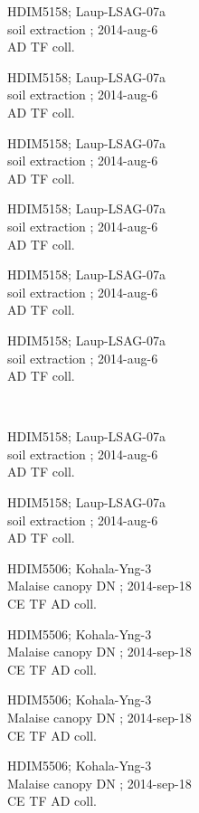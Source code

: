 \documentclass[2pt]{extarticle}
\begin{document}
\noindent
\parbox{0.16\textwidth}{\tiny \raggedright \rule[-0.3\baselineskip]{0pt}{10pt}HDIM5158; Laup-LSAG-07a\\ soil extraction  ; 2014-aug-6\\ AD TF coll.}
\parbox{0.16\textwidth}{\tiny \raggedright \rule[-0.3\baselineskip]{0pt}{10pt}HDIM5158; Laup-LSAG-07a\\ soil extraction  ; 2014-aug-6\\ AD TF coll.}
\parbox{0.16\textwidth}{\tiny \raggedright \rule[-0.3\baselineskip]{0pt}{10pt}HDIM5158; Laup-LSAG-07a\\ soil extraction  ; 2014-aug-6\\ AD TF coll.}
\parbox{0.16\textwidth}{\tiny \raggedright \rule[-0.3\baselineskip]{0pt}{10pt}HDIM5158; Laup-LSAG-07a\\ soil extraction  ; 2014-aug-6\\ AD TF coll.}
\parbox{0.16\textwidth}{\tiny \raggedright \rule[-0.3\baselineskip]{0pt}{10pt}HDIM5158; Laup-LSAG-07a\\ soil extraction  ; 2014-aug-6\\ AD TF coll.}
\parbox{0.16\textwidth}{\tiny \raggedright \rule[-0.3\baselineskip]{0pt}{10pt}HDIM5158; Laup-LSAG-07a\\ soil extraction  ; 2014-aug-6\\ AD TF coll.} \\ 
\vspace{0.001in} 

\noindent
\parbox{0.16\textwidth}{\tiny \raggedright \rule[-0.3\baselineskip]{0pt}{10pt}HDIM5158; Laup-LSAG-07a\\ soil extraction  ; 2014-aug-6\\ AD TF coll.}
\parbox{0.16\textwidth}{\tiny \raggedright \rule[-0.3\baselineskip]{0pt}{10pt}HDIM5158; Laup-LSAG-07a\\ soil extraction  ; 2014-aug-6\\ AD TF coll.}
\parbox{0.16\textwidth}{\tiny \raggedright \rule[-0.3\baselineskip]{0pt}{10pt}HDIM5506; Kohala-Yng-3\\ Malaise canopy DN  ; 2014-sep-18\\ CE TF AD coll.}
\parbox{0.16\textwidth}{\tiny \raggedright \rule[-0.3\baselineskip]{0pt}{10pt}HDIM5506; Kohala-Yng-3\\ Malaise canopy DN  ; 2014-sep-18\\ CE TF AD coll.}
\parbox{0.16\textwidth}{\tiny \raggedright \rule[-0.3\baselineskip]{0pt}{10pt}HDIM5506; Kohala-Yng-3\\ Malaise canopy DN  ; 2014-sep-18\\ CE TF AD coll.}
\parbox{0.16\textwidth}{\tiny \raggedright \rule[-0.3\baselineskip]{0pt}{10pt}HDIM5506; Kohala-Yng-3\\ Malaise canopy DN  ; 2014-sep-18\\ CE TF AD coll.} \\ 
\vspace{0.001in} 
\end{document}
